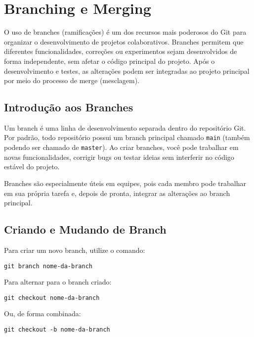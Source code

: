 \newpage
\section{Branching e Merging}

O uso de branches (ramificações) é um dos recursos mais poderosos do Git para organizar o desenvolvimento de projetos colaborativos. Branches permitem que diferentes funcionalidades, correções ou experimentos sejam desenvolvidos de forma independente, sem afetar o código principal do projeto. Após o desenvolvimento e testes, as alterações podem ser integradas ao projeto principal por meio do processo de merge (mesclagem).

\subsection{Introdução aos Branches}

Um branch é uma linha de desenvolvimento separada dentro do repositório Git. Por padrão, todo repositório possui um branch principal chamado \texttt{main} (também podendo ser chamado de \texttt{master}). Ao criar branches, você pode trabalhar em novas funcionalidades, corrigir bugs ou testar ideias sem interferir no código estável do projeto.

Branches são especialmente úteis em equipes, pois cada membro pode trabalhar em sua própria tarefa e, depois de pronta, integrar as alterações ao branch principal.

\subsection{Criando e Mudando de Branch}

Para criar um novo branch, utilize o comando:

\begin{lstlisting}[style=shellstyle]
git branch nome-da-branch
\end{lstlisting}

Para alternar para o branch criado:

\begin{lstlisting}[style=shellstyle]
git checkout nome-da-branch
\end{lstlisting}

Ou, de forma combinada:

\begin{lstlisting}[style=shellstyle]
git checkout -b nome-da-branch
\end{lstlisting}

